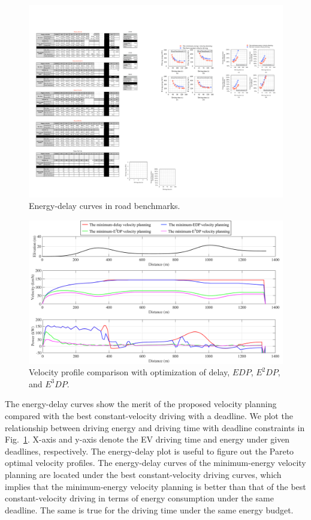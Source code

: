 \documentclass{IEEEtran}
\begin{document}
\begin{figure} 	%
\centering
\includegraphics[width=\hsize]{Figures/ED_curve.pdf}
\caption{Energy-delay curves in road benchmarks.}
\label{fig:energy_delay_curve}
\end{figure} 

\begin{figure} %
\centering
\includegraphics[width=1.0\hsize]{Figures/EDP_velocity_planning.pdf}
\caption{Velocity profile comparison with optimization of delay, $EDP$, $E^2DP$, and $E^3DP$.}
\label{fig:EDP_aware_velocity_planning}
\end{figure} 


The energy-delay curves show the merit of the proposed velocity planning compared with the best constant-velocity driving with a deadline. We plot the relationship between driving energy and driving time with deadline constraints in Fig.~\ref{fig:energy_delay_curve}. X-axis and y-axis denote the EV driving time and energy under given deadlines, respectively. The energy-delay plot is useful to figure out the Pareto optimal velocity profiles. The energy-delay curves of the minimum-energy velocity planning are located under the best constant-velocity driving curves, which implies that the minimum-energy velocity planning is better than that of the best constant-velocity driving in terms of energy consumption under the same deadline. The same is true for the driving time under the same energy budget.
\end{document}

